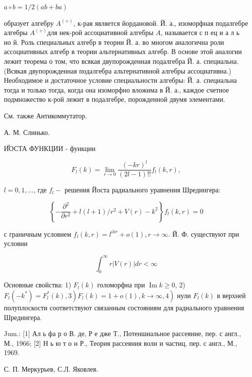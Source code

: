 \documentclass[10pt]{article}
\begin{document}
$a \circ b=1 / 2(a b+b a)$

образует алгебру $A^{(+)}$, к-рая является йордановой. Й. а., изоморфная подалгебре алгебры $A^{(+)}$для нек-рой ассоциативной алгебры $A$, называется с п ец и а л ь но й. Роль специальных алгебр в теории Й. а. во многом аналогична роли ассоциативных алгебр в теории альтернативных алгебр. В основе этой аналогии лежит теорема о том, что всякая двупорожденная подалгебра Й. а. специальна. (Всякая двупорожденная подалгебра альтернативной алгебры ассоциативна.) Необходимое и достаточное условие специальности алгебры: Й. а. специальна тогда и только тогда, когда она изоморфно вложима в Й. а., каждое счетное подмножество к-рой лежит в подалгебре, порожденной двумя элементами.



См. также Антикоммутатор.



А. М. Слинько.



ИัОСТА ФУНКЦИИ - функции



\[

F_{l}(k)=\lim _{r \rightarrow 0} \frac{(-k r)^{l}}{(2 l-1) ! !} f_{l}(k, r),

\]



$l=0,1, \ldots$, где $f_{l}-$ решения Йоста радиального уравнения Шредингера:



\[

\left\{-\frac{\partial^{2}}{\partial r^{2}}+l(l+1) / r^{2}+V(r)-k^{2}\right\} f_{l}(k, r)=0

\]



с граничным условием $f_{l}(k, r)=l^{i k r}+o(1), r \rightarrow \infty$. Й. Ф. существуют при условии



\[

\int_{0}^{\infty} r|V(r)| d r<\infty

\]



Основные свойства: 1) $F_{l}(k)$ голоморфна при $\operatorname{Im} k \geqslant 0$, 2) $\left.\left.F_{l}\left(-k^{*}\right)=F_{l}^{*}(k), 3\right) F_{l}(k)=1+o(1), k \rightarrow \infty, 4\right)$ нули $F_{l}(k)$ в верхней полуплоскости соответствуют связанным состояниям для радиального уравнения Шредингера.



Jum.: [1] Ал ь фа р о В. де, Р е дже Т., Потеншиальное рассеяние, пер. с англ., М., 1966; [2] Н ь ю т о н Р., Теория рассеяния волн и частиц, пер. с англ., М., 1969.



С. П. Меркурьев, С.Л. Яковлев.
\end{document}
